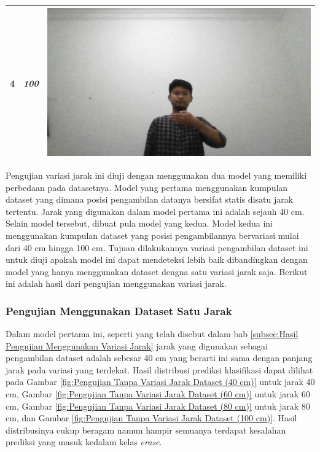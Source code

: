 \begin{longtable}{|c|c|c|}
  \hline
  4 & \emph{100}  &  \includegraphics[scale=0.2]{gambar/pengujian-jarak/pengambilan-data/jarak-100cm.jpg} \\
  \hline
\end{longtable}

Pengujian variasi jarak ini diuji dengan menggunakan dua model yang memiliki perbedaan pada datasetnya. Model yang pertama menggunakan kumpulan dataset yang dimana posisi pengambilan datanya bersifat statis disatu jarak tertentu. Jarak yang digunakan dalam model pertama ini adalah sejauh 40 cm. Selain model tersebut, dibuat pula model yang kedua. Model kedua ini menggunakan kumpulan dataset yang posisi pengambilannya bervariasi mulai dari 40 cm hingga 100 cm. Tujuan dilakukannya variasi pengambilan dataset ini untuk diuji apakah model ini dapat mendeteksi lebih baik  dibandingkan dengan model yang hanya menggunakan dataset dengna satu variasi jarak saja. Berikut ini adalah hasil dari pengujian menggunakan variasi jarak.

\subsubsection{Pengujian Menggunakan Dataset Satu Jarak}
\label{subsubsec:Pengujian Menggunakan Dataset Satu Jarak}

Dalam model pertama ini, seperti yang telah disebut dalam bab \ref{subsec:Hasil Pengujian Menggunakan Variasi Jarak} jarak yang digunakan sebagai pengambilan dataset adalah sebesar 40 cm yang berarti ini sama dengan panjang jarak pada variasi yang terdekat. Hasil distribusi prediksi klasifikasi dapat dilihat pada Gambar \ref{fig:Pengujian Tanpa Variasi Jarak Dataset (40 cm)} untuk jarak 40 cm, Gambar \ref{fig:Pengujian Tanpa Variasi Jarak Dataset (60 cm)} untuk jarak 60 cm, Gambar \ref{fig:Pengujian Tanpa Variasi Jarak Dataset (80 cm)} untuk jarak 80 cm, dan Gambar \ref{fig:Pengujian Tanpa Variasi Jarak Dataset (100 cm)}. Hasil distribusinya cukup beragam namun hampir semuanya terdapat kesalahan prediksi yang masuk kedalam kelas \emph{erase}.  

